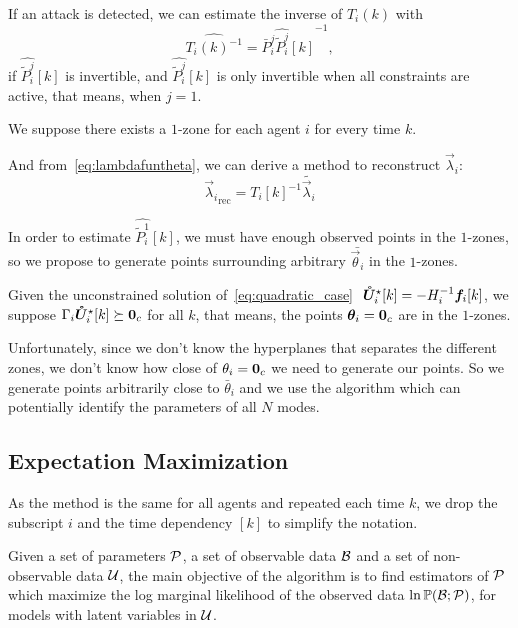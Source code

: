 \documentclass{ifacconf}  %
\begin{document}
If an attack is detected, we can estimate the inverse of $T_{i}(k)$ with
\begin{equation}
\widehat{{T_{i}(k)}^{-1}}=\bar{P}_{i}^{j}{\widehat{\tilde{P}_{i}^{j}}[k]}^{-1},
\end{equation}
if $\widehat{\tilde{P}_{i}^{j}}[k]$ is invertible, and $\widehat{\tilde{P}_{i}^{j}}[k]$ is only invertible when all constraints are active, that means, when ${j=1}$.
\begin{assumption}
  We suppose there exists a $1$-zone for each agent $i$ for every time $k$.
\end{assumption}
And from~\eqref{eq:lambdafuntheta}, we can derive a method to reconstruct $\vec{\lambda}_{i}$:
\begin{equation}
  \label{eq:lambda_reconstruction}
  {\vec{\lambda}_{i}}_{\mathrm{rec}}=\widehat{{T_{i}[k]}^{-1}} \tilde{\vec{\lambda}_{i}}
\end{equation}


In order to estimate $\widehat{\tilde{P}_{i}^{1}}[k]$, we must have enough observed points in the $1$-zones, so
we propose to generate points surrounding arbitrary $\bar{\vec{\theta}_{i}}$ in the $1$-zones.

\begin{assumption}\label{ass:}
  Given the unconstrained solution of~\ref{eq:quadratic_case} ${ {\optuncUik}=-H_{i}^{-1}\fik}$, we suppose
$\bar{\Gamma}_{i}\optuncUik\succeq\0_{c}$ for all $k$, that means, the points $\boldsymbol{\theta}_i=\mathbf{0}_{c}$ are in the $1$-zones.
\end{assumption}

Unfortunately, since we don't know the hyperplanes that separates the different zones, we don't know how close of $\relax{\theta}_{i}=\mathbf{0}_{c}$ we need to generate our points.
So we generate points arbitrarily close to $\bar{\theta}_{i}$ and we use the \EM{} algorithm which can potentially identify the parameters of all $N$ modes.
\subsection{Expectation Maximization}
As the method is the same for all agents and repeated each time $k$, we drop the subscript $i$ and the time dependency $[k]$ to simplify the notation.


Given a set of parameters $\mathcal{P}$, a set of observable data $\mathcal{B}$ and a set of non-observable data $\mathcal{U}$, the main objective of the \EM{} algorithm is to find estimators of $\mathcal{P}$ which maximize the log marginal likelihood of the observed data ${\ln\mathbb{P}(\mathcal{B};\mathcal{P})}$, for models with latent variables in $\mathcal{U}$.
\end{document}
